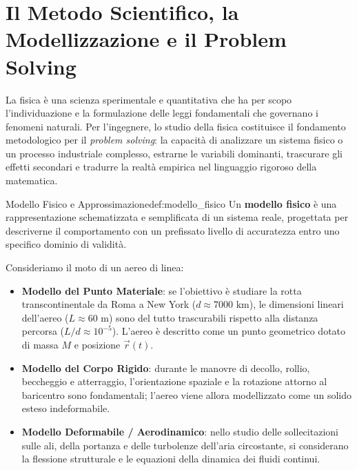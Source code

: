 \section{Il Metodo Scientifico, la Modellizzazione e il Problem Solving}
\label{sec:metodo_scientifico}

La fisica è una scienza sperimentale e quantitativa che ha per scopo l'individuazione e la formulazione delle leggi fondamentali che governano i fenomeni naturali. Per l'ingegnere, lo studio della fisica costituisce il fondamento metodologico per il \emph{problem solving}: la capacità di analizzare un sistema fisico o un processo industriale complesso, estrarne le variabili dominanti, trascurare gli effetti secondari e tradurre la realtà empirica nel linguaggio rigoroso della matematica.

\begin{definizione}{Modello Fisico e Approssimazione}{def:modello_fisico}
Un \textbf{modello fisico} è una rappresentazione schematizzata e semplificata di un sistema reale, progettata per descriverne il comportamento con un prefissato livello di accuratezza entro uno specifico dominio di validità.
\end{definizione}

\begin{esempio}
Consideriamo il moto di un aereo di linea:
\begin{itemize}
    \item \textbf{Modello del Punto Materiale}: se l'obiettivo è studiare la rotta transcontinentale da Roma a New York ($d \approx 7000\text{ km}$), le dimensioni lineari dell'aereo ($L \approx 60\text{ m}$) sono del tutto trascurabili rispetto alla distanza percorsa ($L/d \approx 10^{-5}$). L'aereo è descritto come un punto geometrico dotato di massa $M$ e posizione $\vec{r}(t)$.
    \item \textbf{Modello del Corpo Rigido}: durante le manovre di decollo, rollio, beccheggio e atterraggio, l'orientazione spaziale e la rotazione attorno al baricentro sono fondamentali; l'aereo viene allora modellizzato come un solido esteso indeformabile.
    \item \textbf{Modello Deformabile / Aerodinamico}: nello studio delle sollecitazioni sulle ali, della portanza e delle turbolenze dell'aria circostante, si considerano la flessione strutturale e le equazioni della dinamica dei fluidi continui.
\end{itemize}
\end{esempio}

